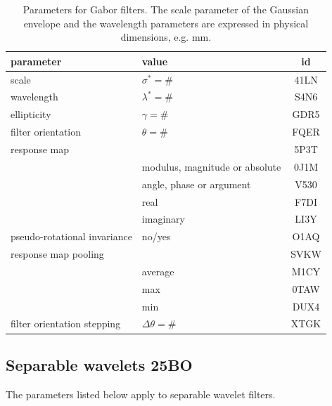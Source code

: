 \documentclass[fleqn,a4paper,oneside,openany]{book}
\newcommand\id[1]{{\hfill\normalsize{\idfont #1}}}
\newcommand\textid[1]{{\normalsize{\idfont #1}}}
\begin{document}
\begin{table}[ht]
\centering
\small
\begin{tabular}{llc}
\toprule
\textbf{parameter} & \textbf{value} & \textbf{id}\\
\midrule
scale & \(\sigma^*=\#\) & \textid{41LN}\\
wavelength & \(\lambda^*=\#\) & \textid{S4N6}\\
ellipticity & \(\gamma=\#\) & \textid{GDR5}\\
filter orientation & \(\theta=\#\) & \textid{FQER}\\
response map & & \textid{5P3T}\\
& modulus, magnitude or absolute & \textid{0J1M}\\
& angle, phase or argument & \textid{V530}\\
& real & \textid{F7DI}\\
& imaginary & \textid{LI3Y}\\
pseudo-rotational invariance & no/yes & \textid{O1AQ}\\
response map pooling & & \textid{SVKW}\\
& average & \textid{M1CY}\\
& max & \textid{0TAW}\\
& min & \textid{DUX4}\\
filter orientation stepping & \(\Delta\theta=\#\) & \textid{XTGK}\\
\bottomrule
\end{tabular}
\caption{Parameters for Gabor filters. The scale parameter of the Gaussian envelope and the wavelength parameters are expressed in physical dimensions, e.g. mm.}
\end{table}

\FloatBarrier

\subsection[Separable wavelets]{Separable wavelets \id{25BO}}
The parameters listed below apply to separable wavelet filters.
\end{document}
